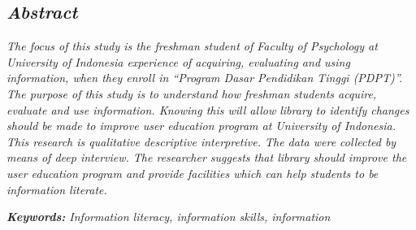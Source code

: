 %
%
%

\begin{singlespace} %
\chapter*{\textit{Abstract}}


{
	\textit{The focus of this study is the freshman student of Faculty of Psychology at University of
	Indonesia experience of acquiring, evaluating and using information, when they enroll in
	“Program Dasar Pendidikan Tinggi (PDPT)”. The purpose of this study is to understand
	how freshman students acquire, evaluate and use information. Knowing this will allow
	library to identify changes should be made to improve user education program at
	University of Indonesia. This research is qualitative descriptive interpretive. The data
	were collected by means of deep interview. The researcher suggests that library should
	improve the user education program and provide facilities which can help students to be
	information literate.}

	\vspace{1.5em}

	\noindent \textit{\textbf{Keywords:} Information literacy, information skills, information}
}
\end{singlespace}
\newpage